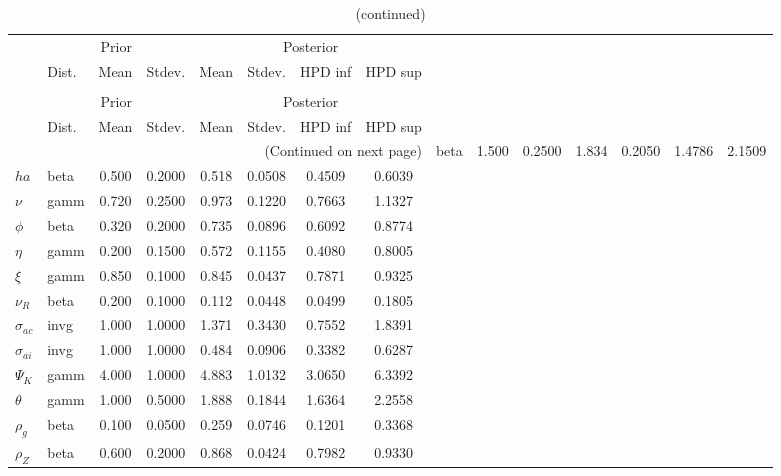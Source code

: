  
\begin{center}
\begin{longtable}{llcccccc} 
\caption{Results from Metropolis-Hastings (parameters)}
 \label{Table:MHPosterior:1}\\
\toprule 
  & \multicolumn{3}{c}{Prior}  &  \multicolumn{4}{c}{Posterior} \\
  \cmidrule(r{.75em}){2-4} \cmidrule(r{.75em}){5-8}
  & Dist. & Mean  & Stdev. & Mean & Stdev. & HPD inf & HPD sup\\
\midrule \endfirsthead 
\caption{(continued)}\\\toprule 
  & \multicolumn{3}{c}{Prior}  &  \multicolumn{4}{c}{Posterior} \\
  \cmidrule(r{.75em}){2-4} \cmidrule(r{.75em}){5-8}
  & Dist. & Mean  & Stdev. & Mean & Stdev. & HPD inf & HPD sup\\
\midrule \endhead 
\bottomrule \multicolumn{8}{r}{(Continued on next page)} \endfoot 
\bottomrule \endlastfoot 
${\sigma}$ & beta &   1.500 & 0.2500 &   1.834& 0.2050 &  1.4786 &  2.1509 \\ 
${ha}$ & beta &   0.500 & 0.2000 &   0.518& 0.0508 &  0.4509 &  0.6039 \\ 
$\nu$ & gamm &   0.720 & 0.2500 &   0.973& 0.1220 &  0.7663 &  1.1327 \\ 
${\phi}$ & beta &   0.320 & 0.2000 &   0.735& 0.0896 &  0.6092 &  0.8774 \\ 
${\eta}$ & gamm &   0.200 & 0.1500 &   0.572& 0.1155 &  0.4080 &  0.8005 \\ 
$\xi$ & gamm &   0.850 & 0.1000 &   0.845& 0.0437 &  0.7871 &  0.9325 \\ 
${\nu_R}$ & beta &   0.200 & 0.1000 &   0.112& 0.0448 &  0.0499 &  0.1805 \\ 
${\sigma_{ac}}$ & invg &   1.000 & 1.0000 &   1.371& 0.3430 &  0.7552 &  1.8391 \\ 
${\sigma_{ai}}$ & invg &   1.000 & 1.0000 &   0.484& 0.0906 &  0.3382 &  0.6287 \\ 
${\Psi_{K}}$ & gamm &   4.000 & 1.0000 &   4.883& 1.0132 &  3.0650 &  6.3392 \\ 
${\theta}$ & gamm &   1.000 & 0.5000 &   1.888& 0.1844 &  1.6364 &  2.2558 \\ 
${\rho_g}$ & beta &   0.100 & 0.0500 &   0.259& 0.0746 &  0.1201 &  0.3368 \\ 
${\rho_Z}$ & beta &   0.600 & 0.2000 &   0.868& 0.0424 &  0.7982 &  0.9330 \\ 

\end{longtable}
\end{center}
